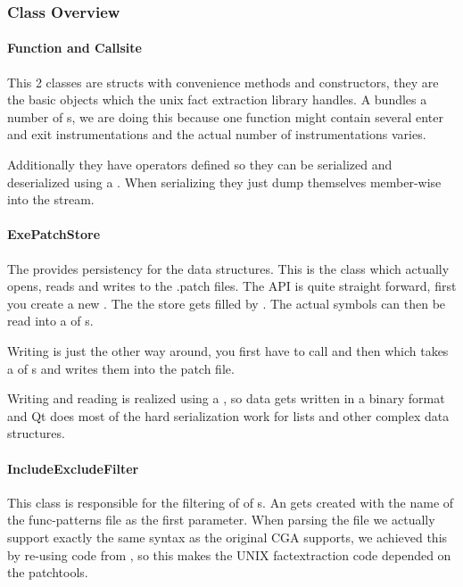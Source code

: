 \subsubsection{Class Overview}

\paragraph{Function and Callsite}

This 2 classes are structs with convenience methods and constructors, they are the basic objects which the unix fact extraction library handles.  A  bundles a number of s, we are doing this because one function might contain several enter and exit instrumentations and the actual number of instrumentations varies.

Additionally they have operators defined so they can be serialized and deserialized using a .  When serializing they just dump themselves member-wise into the stream.

\paragraph{ExePatchStore}

The  provides persistency for the data structures.  This is the class which actually opens, reads and writes to the .patch files.  The API is quite straight forward, first you create a new .  The the store gets filled by .  The actual symbols can then be read into a  of s.

Writing is just the other way around, you first have to call  and then  which takes a  of s and writes them into the patch file.

Writing and reading is realized using a , so data gets written in a binary format and Qt does most of the hard serialization work for lists and other complex data structures.

\paragraph{IncludeExcludeFilter}

This class is responsible for the filtering of  of s.   An  gets created with the name of the func-patterns file as the first parameter.  When parsing the file we actually support exactly the same syntax as the original CGA supports, we achieved this by re-using code from , so this makes the UNIX factextraction code depended on the patchtools.

